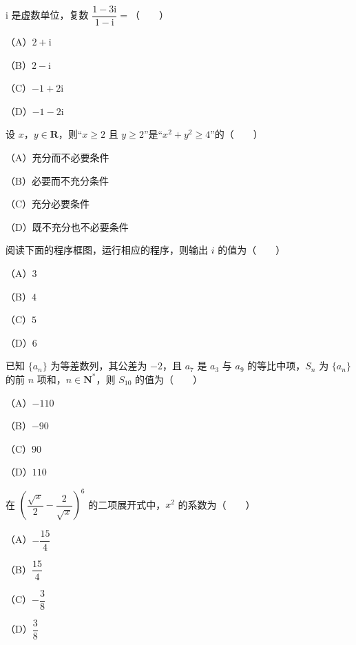 \begin{question}
$\mathrm{i}$ 是虚数单位，复数 $\dfrac{1-3\mathrm{i}}{1-\mathrm{i}}=$\mbox{（　　）}

（A）$2+\mathrm{i}$

（B）$2-\mathrm{i}$

（C）$-1+2\mathrm{i}$

（D）$-1-2\mathrm{i}$

\end{question}
\begin{question}
设 $x$，$y\in\mathbf{R}$，则“$x\geqslant2$ 且 $y\geqslant2$”是“$x^2+y^2\geqslant4$”的\mbox{（　　）}

（A）充分而不必要条件

（B）必要而不充分条件

（C）充分必要条件

（D）既不充分也不必要条件

\Needspace{0.4\textheight}
\end{question}
\begin{question}
阅读下面的程序框图，运行相应的程序，则输出 $i$ 的值为\mbox{（　　）}

（A）$3$

（B）$4$

（C）$5$

（D）$6$
\nopagebreak[4]
\begin{center}\end{center}
\nopagebreak[4]
\end{question}
\begin{question}
已知 $\{a_n\}$ 为等差数列，其公差为 $-2$，且 $a_7$ 是 $a_3$ 与 $a_9$ 的等比中项，$S_n$ 为 $\{a_n\}$ 的前 $n$ 项和，$n\in\mathbf{N}^*$，则 $S_{10}$ 的值为\mbox{（　　）}

（A）$-110$

（B）$-90$

（C）$90$

（D）$110$

\end{question}
\begin{question}
在 $\left(\dfrac{\sqrt{x}}{2}-\dfrac{2}{\sqrt{x}}\right)^6$ 的二项展开式中，$x^2$ 的系数为\mbox{（　　）}

（A）$-\dfrac{15}{4}$

（B）$\dfrac{15}{4}$

（C）$-\dfrac38$

（D）$\dfrac38$

\Needspace{0.4\textheight}
\end{question}
